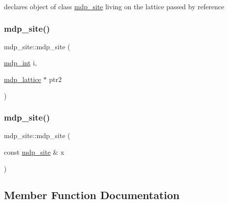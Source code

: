 declares object of class \hyperlink{classmdp__site}{mdp\+\_\+site} living on the lattice passed by reference \mbox{\label{classmdp__site_a6bde992431323419da31c2ce584d7821}} 
\subsubsection{\texorpdfstring{mdp\+\_\+site()}{mdp\_site()}\hspace{0.1cm}{\footnotesize\ttfamily [3/4]}}
{\footnotesize\ttfamily mdp\+\_\+site\+::mdp\+\_\+site (\begin{DoxyParamCaption}\item[{\hyperlink{mdp__global__vars_8h_aaa1ad9d0dcd2124aa5af0120d9954174}{mdp\+\_\+int}}]{i,  }\item[{\hyperlink{classmdp__lattice}{mdp\+\_\+lattice} $\ast$}]{ptr2 }\end{DoxyParamCaption})\hspace{0.3cm}{\ttfamily [inline]}}

\mbox{\label{classmdp__site_aa16c96d8e1013d1581df1ae3a980d272}} 
\subsubsection{\texorpdfstring{mdp\+\_\+site()}{mdp\_site()}\hspace{0.1cm}{\footnotesize\ttfamily [4/4]}}
{\footnotesize\ttfamily mdp\+\_\+site\+::mdp\+\_\+site (\begin{DoxyParamCaption}\item[{const \hyperlink{classmdp__site}{mdp\+\_\+site} \&}]{x }\end{DoxyParamCaption})\hspace{0.3cm}{\ttfamily [inline]}}



\subsection{Member Function Documentation}
\mbox{\label{classmdp__site_aff34724d521041f255daf4fad09a0408}} 
